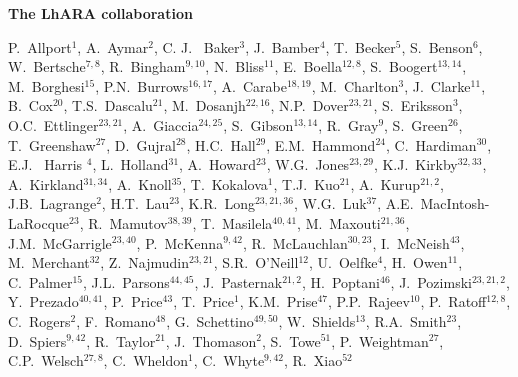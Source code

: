 \vspace{0.75cm}
\begin{center}
  {\bf \color{BlueViolet} The LhARA collaboration} \\
\end{center}
\vspace{0.50cm}
\begin{center}
  P.~Allport$^{1}$,
  A.~Aymar$^{2}$,
  C. J. ~Baker$^{3}$,
  J.~Bamber$^{4}$,
  T.~Becker$^{5}$,
  S.~Benson$^{6}$,
  W.~Bertsche$^{7,8}$,
  R.~Bingham$^{9,10}$,
  N.~Bliss$^{11}$,
  E.~Boella$^{12,8}$,
  S.~Boogert$^{13,14}$,
  M.~Borghesi$^{15}$,
  P.N.~Burrows$^{16,17}$,
  A.~Carabe$^{18,19}$,
  M.~Charlton$^{3}$,
  J.~Clarke$^{11}$,
  B.~Cox$^{20}$,
  T.S.~Dascalu$^{21}$,
  M.~Dosanjh$^{22,16}$,
  N.P.~Dover$^{23,21}$,
  S.~Eriksson$^{3}$,
  O.C.~Ettlinger$^{23,21}$,
  A.~Giaccia$^{24,25}$,
  S.~Gibson$^{13,14}$,
  R.~Gray$^{9}$,
  S.~Green$^{26}$,
  T.~Greenshaw$^{27}$,
  D.~Gujral$^{28}$,
  H.C.~Hall$^{29}$,
  E.M.~Hammond$^{24}$,
  C.~Hardiman$^{30}$,
  E.J. ~Harris $^{4}$,
  L.~Holland$^{31}$,
  A.~Howard$^{23}$,
  W.G.~Jones$^{23,29}$,
  K.J.~Kirkby$^{32,33}$,
  A.~Kirkland$^{31,34}$,
  A.~Knoll$^{35}$,
  T.~Kokalova$^{1}$,
  T.J.~Kuo$^{21}$,
  A.~Kurup$^{21,2}$,
  J.B.~Lagrange$^{2}$,
  H.T.~Lau$^{23}$,
  K.R.~Long$^{23,21,36}$,
  W.G.~Luk$^{37}$,
  A.E.~MacIntosh-LaRocque$^{23}$,
  R.~Mamutov$^{38,39}$,
  T.~Masilela$^{40,41}$,
  M.~Maxouti$^{21,36}$,
  J.M.~McGarrigle$^{23,40}$,
  P.~McKenna$^{9,42}$,
  R.~McLauchlan$^{30,23}$,
  I.~McNeish$^{43}$,
  M.~Merchant$^{32}$,
  Z.~Najmudin$^{23,21}$,
  S.R.~O'Neill$^{12}$,
  U.~Oelfke$^{4}$,
  H.~Owen$^{11}$,
  C.~Palmer$^{15}$,
  J.L.~Parsons$^{44,45}$,
  J.~Pasternak$^{21,2}$,
  H.~Poptani$^{46}$,
  J.~Pozimski$^{23,21,2}$,
  Y.~Prezado$^{40,41}$,
  P.~Price$^{43}$,
  T.~Price$^{1}$,
  K.M.~Prise$^{47}$,
  P.P.~Rajeev$^{10}$,
  P.~Ratoff$^{12,8}$,
  C.~Rogers$^{2}$,
  F.~Romano$^{48}$,
  G.~Schettino$^{49,50}$,
  W.~Shields$^{13}$,
  R.A.~Smith$^{23}$,
  D.~Spiers$^{9,42}$,
  R.~Taylor$^{21}$,
  J.~Thomason$^{2}$,
  S.~Towe$^{51}$,
  P.~Weightman$^{27}$,
  C.P.~Welsch$^{27,8}$,
  C.~Wheldon$^{1}$,
  C.~Whyte$^{9,42}$,
  R.~Xiao$^{52}$
\end{center}
\vspace{2.5cm}
